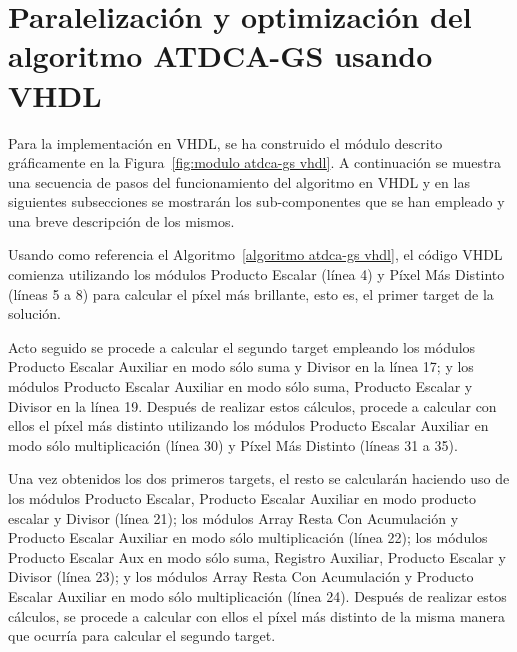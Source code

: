 \section{Paralelización y optimización del algoritmo ATDCA-GS usando VHDL}

Para la implementación en VHDL, se ha construido el módulo descrito gráficamente en la Figura~\ref{fig:modulo atdca-gs vhdl}. A continuación se muestra una secuencia de pasos del funcionamiento del algoritmo en VHDL y en las siguientes subsecciones se mostrarán los sub-componentes que se han empleado y una breve descripción de los mismos.

Usando como referencia el Algoritmo~\ref{algoritmo atdca-gs vhdl}, el código VHDL comienza utilizando los módulos Producto Escalar (línea 4) y Píxel Más Distinto (líneas 5 a 8) para calcular el píxel más brillante, esto es, el primer target de la solución.

Acto seguido se procede a calcular el segundo target empleando los módulos Producto Escalar Auxiliar en modo sólo suma y Divisor en la línea 17; y los módulos Producto Escalar Auxiliar en modo sólo suma, Producto Escalar y Divisor en la línea 19. Después de realizar estos cálculos, procede a calcular con ellos el píxel más distinto utilizando los módulos Producto Escalar Auxiliar en modo sólo multiplicación (línea 30) y Píxel Más Distinto (líneas 31 a 35).

Una vez obtenidos los dos primeros targets, el resto se calcularán haciendo uso de los módulos Producto Escalar, Producto Escalar Auxiliar en modo producto escalar y Divisor (línea 21); los módulos Array Resta Con Acumulación y Producto Escalar Auxiliar en modo sólo multiplicación (línea 22); los módulos Producto Escalar Aux en modo sólo suma, Registro Auxiliar, Producto Escalar y Divisor (línea 23); y los módulos Array Resta Con Acumulación y Producto Escalar Auxiliar en modo sólo multiplicación (línea 24). Después de realizar estos cálculos, se procede a calcular con ellos el píxel más distinto de la misma manera que ocurría para calcular el segundo target.


